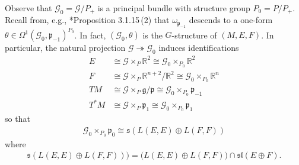 \documentclass[11pt]{amsart}
\begin{document}
Observe that $\mathcal G_0=\mathcal G/P_+$ is a principal bundle with structure group $P_0=P/P_+$. Recall from, e.g., \cite{Book}*{Proposition 3.1.15\,(2)} that $\omega_{\mathfrak p_{-1}}$ descends to a one-form $\theta\in\Omega^1(\mathcal G_0,\mathfrak p_{-1})^{P_0}$. In fact, $(\mathcal G_0,\theta)$ is the $G$-structure of $(M,E,F)$. In particular, the natural projection $\mathcal G\twoheadrightarrow \mathcal G_0$ induces identifications 
\begin{align*}
E&\cong\mathcal G\times_P\mathbb R^2\cong\mathcal G_0\times_{P_0}\mathbb R^2\\
F&\cong\mathcal G\times_P\mathbb R^{n+2}/\mathbb R^2\cong\mathcal G_0\times_{P_0}\mathbb R^n\\
TM&\cong\mathcal G\times_P\mathfrak g/\mathfrak p\cong\mathcal G_0\times_{P_0}\mathfrak p_{-1}\\
T^*M&\cong\mathcal G\times_P\mathfrak p_1\cong\mathcal G_0\times_{P_0}\mathfrak p_1
\end{align*}
so that
\begin{align*}
    \mathcal G_0\times_{P_0}\mathfrak p_0\cong \mathfrak s(L(E,E)\oplus L(F,F))
\end{align*}
where
\begin{align}\label{frak s}
   \mathfrak s(L(E,E)\oplus L(F,F)))=\Big(L(E,E)\oplus L(F,F)\Big)\cap\mathfrak{sl}(E\oplus F).
\end{align}
\end{document}
